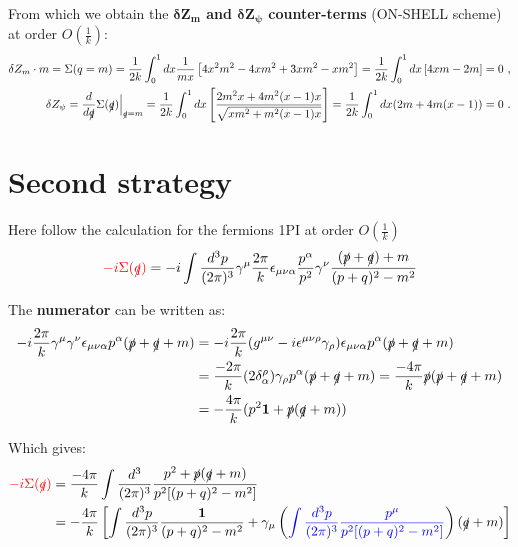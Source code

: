 \documentclass[a4paper,11pt,DIV=12]{scrartcl}
\begin{document}
From which we obtain the \textbf{$\mathbf{\delta Z_m}$ and $\mathbf{\delta Z_\psi}$ counter-terms} (ON-SHELL scheme) at order $O(\frac{1}{k})$:
\begin{align*}
    \delta Z_m \cdot m = \Sigma(q=m) = \frac{1}{2k}\int_0^1 dx \frac{1}{mx}\left[4x^2m^2-4xm^2+3xm^2-xm^2 \right]=\frac{1}{2k}\int_0^1 dx \left[4xm - 2m \right]=0\ , 
    \\
    \delta Z_\psi=\frac{d}{d \slashed{q}}\Sigma(\slashed{q})\Big|_{\slashed{q}=m}=\frac{1}{2k}\int_0^1 dx \left[ \frac{2m^2x+4m^2(x-1)x}{\sqrt{xm^2+m^2(x-1)x}} \right]=\frac{1}{2k}\int_0^1 dx (2m + 4m(x-1))= 0\ .
\end{align*}

\newpage

\section{Second strategy}

Here follow the calculation for the fermions 1PI at order $O(\frac{1}{k})$
\begin{equation}
    \textcolor{red} {-i \Sigma(\slashed{q})}=-i \int \frac{d^3 p}{(2\pi)^3}\gamma^\mu \frac{2\pi}{k} \epsilon_{\mu \nu \alpha} \frac{p^\alpha}{p^2}\gamma^\nu \frac{(\slashed{p}+\slashed{q})+m}{(p+q)^2-m^2}
\end{equation}

The \textbf{numerator} can be written as:
\begin{align*}
    -i\frac{2\pi}{k} \gamma^\mu \gamma^\nu \epsilon_{\mu \nu \alpha}p^\alpha (\slashed{p}+\slashed{q}+m)&=-i \frac{2\pi}{k}(g^{\mu \nu}-i\epsilon^{\mu \nu \rho}\gamma_\rho)\epsilon_{\mu \nu \alpha}p^\alpha(\slashed{p}+\slashed{q}+m) 
    \\ &= \frac{-2\pi}{k}(2\delta^\rho_\alpha) \gamma_\rho p^\alpha (\slashed{p}+\slashed{q}+m) =\frac{-4\pi}{k}\slashed{p}(\slashed{p}+\slashed{q}+m)
    \\ &=-\frac{4\pi}{k}(p^2 \mathbf{1} + \slashed{p}(\slashed{q}+m))
\end{align*}

Which gives:
\begin{align*}
   \textcolor{red} {-i \Sigma(\slashed{q})} &=\frac{-4\pi}{k} \int \frac{d^3}{(2\pi)^3} \frac{p^2 + \slashed{p}(\slashed{q}+m)}{p^2[(p+q)^2-m^2]}
    \\ &= -\frac{4 \pi}{k}\left[ \int \frac{d^3p}{(2\pi)^3} \frac{\mathbf{1}}{(p+q)^2-m^2} + \gamma_\mu \left( \textcolor{blue}{\int \frac{d^3p}{(2\pi)^3} \frac{p^\mu}{p^2 [(p+q)^2 - m^2]}} \right) (\slashed{q}+m)  \right]
\end{align*}
\end{document}

